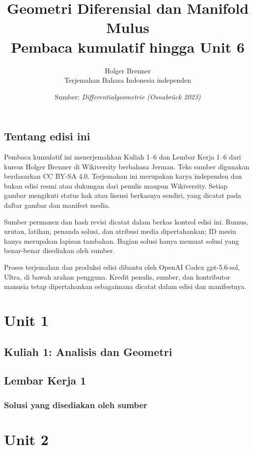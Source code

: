 \documentclass[11pt,a4paper,oneside]{book}
\title{Geometri Diferensial dan Manifold Mulus\\\large Pembaca kumulatif hingga Unit 6}
\author{Holger Brenner\\Terjemahan Bahasa Indonesia independen}
\date{Sumber: \textit{Differentialgeometrie (Osnabrück 2023)}}
\begin{document}
\hypersetup{pageanchor=false}
\maketitle
\hypersetup{pageanchor=true}
\frontmatter
\chapter*{Tentang edisi ini}
Pembaca kumulatif ini menerjemahkan Kuliah 1--6 dan Lembar Kerja 1--6 dari kursus Holger Brenner di Wikiversity berbahasa Jerman. Teks sumber digunakan berdasarkan CC BY-SA 4.0. Terjemahan ini merupakan karya independen dan bukan edisi resmi atau dukungan dari penulis maupun Wikiversity. Setiap gambar mengikuti status hak atau lisensi berkasnya sendiri, yang dicatat pada daftar gambar dan manifest media.

Sumber permanen dan hash revisi dicatat dalam berkas kontrol edisi ini. Rumus, urutan, latihan, penanda solusi, dan atribusi media dipertahankan; ID mesin hanya merupakan lapisan tambahan. Bagian solusi hanya memuat solusi yang benar-benar disediakan oleh sumber.

Proses terjemahan dan produksi edisi dibantu oleh OpenAI Codex gpt-5.6-sol, Ultra, di bawah arahan pengguna. Kredit penulis, sumber, dan kontributor manusia tetap dipertahankan sebagaimana dicatat dalam edisi dan manifestnya.
\tableofcontents

\mainmatter
\part{Unit 1}
\chapter[Kuliah 1]{Kuliah 1: Analisis dan Geometri}


\chapter{Lembar Kerja 1}


\section*{Solusi yang disediakan oleh sumber}


\part{Unit 2}
\end{document}

